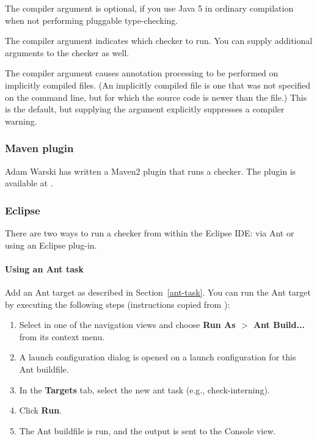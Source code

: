 The  compiler argument is optional, if you use Java 5 in
ordinary compilation when not performing pluggable type-checking.

The  compiler argument indicates which checker to
run.  You can supply additional arguments to the checker as well.

The  compiler argument causes annotation processing
to be performed on implicitly compiled files.  (An implicitly compiled file
is one that was not specified on the command line, but for which the source
code is newer than the  file.)  This is the default, but
supplying the argument explicitly suppresses a compiler warning.


\subsubsection{Maven plugin\label{maven-task}}

Adam Warski has written a Maven2 plugin that runs a checker.
The plugin is available at 
.


\subsubsection{Eclipse\label{eclipse}}

There are two ways to run a checker from within the Eclipse IDE:  via Ant
or using an Eclipse plug-in.


\paragraph{Using an Ant task}

Add an Ant target as described in Section~\ref{ant-task}.  You can
run the Ant target by executing the following steps
(instructions copied from
):

\begin{enumerate}

\item
  Select  in one of the navigation views and choose
  {\bf Run As $>$ Ant Build...} from its context menu.

\item
  A launch configuration dialog is opened on a launch configuration
  for this Ant buildfile.

\item
  In the {\bf Targets} tab, select the new ant task (e.g., check-interning).

\item
  Click {\bf Run}.

\item
  The Ant buildfile is run, and the output is sent to the Console view.

\end{enumerate}

